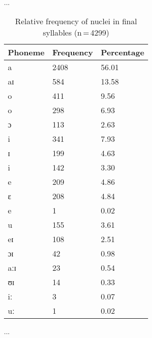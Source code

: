 ...

\begin{table}[hp]\centering
\caption[Relative frequency of nuclei in final syllables]{Relative frequency of nuclei in final syllables (n\,=\,4299)}
\begin{tabu} to 0.5\textwidth{X X[c] X[c]}
\tableheaderfont\toprule
Phoneme
	& Frequency
	& Percentage
	\\
	
\toprule

a
	& 2408
	& 56.01\pct
	\\
aɪ
	& 584
	& 13.58\pct
	\\
o
	& 411
	& 9.56\pct
	\\
\rowfont{\footnotesize\itshape}
\raggedleft
o
	& 298
	& 6.93\pct
	\\
\rowfont{\footnotesize\itshape}
\raggedleft
ɔ
	& 113
	& 2.63\pct
	\\
i
	& 341
	& 7.93\pct
	\\
\rowfont{\footnotesize\itshape}
\raggedleft
ɪ
	& 199
	& 4.63\pct
	\\
\rowfont{\footnotesize\itshape}
\raggedleft
i
	& 142
	& 3.30\pct
	\\
e
	& 209
	& 4.86\pct
	\\
\rowfont{\footnotesize\itshape}
\raggedleft
ɛ
	& 208
	& 4.84\pct
	\\
\rowfont{\footnotesize\itshape}
\raggedleft
e
	& 1
	& 0.02\pct
	\\
u
	& 155
	& 3.61\pct
	\\
eɪ
	& 108
	& 2.51\pct
	\\
ɔɪ
	& 42
	& 0.98\pct
	\\
aːɪ
	& 23
	& 0.54\pct
	\\
ʊɪ
	& 14
	& 0.33\pct
	\\
iː
	& 3
	& 0.07\pct
	\\
uː
	& 1
	& 0.02\pct
	\\

\bottomrule
\end{tabu}
\label{tab:finnuc}
\end{table}

...

